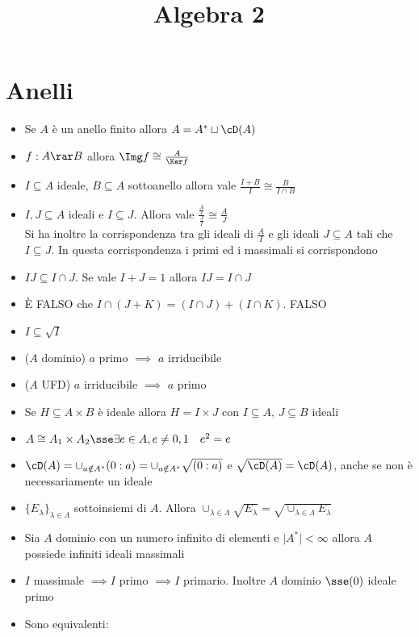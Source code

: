 \documentclass[a4paper,NoNotes,GeneralMath]{stdmdoc}
\begin{document}
	\title{Algebra 2}
	
	\section*{Anelli}
	\begin{itemize}
		\item Se $A$ è un anello finito allora $A = A^* \sqcup \cD(A)$
		\item $f: A \rar B$ allora $\Img f \cong \frac{A}{\Ker f}$
		\item $I \subseteq A$ ideale, $B \subseteq A$ sottoanello allora vale $\frac{I+B}{I} \cong \frac{B}{I\cap B}$
		\item $I, J \subseteq A$ ideali e $I \subseteq J$. Allora vale $\frac{\frac{A}{I}}{\frac{J}{I}} \cong \frac{A}{J}$ \\
			Si ha inoltre la corrispondenza tra gli ideali di $\frac{A}{I}$ e gli ideali $J \subseteq A$ tali che $I \subseteq J$. In questa corrispondenza i primi ed i massimali si corrispondono
		\item $IJ \subseteq I \cap J$. Se vale $I + J = 1$ allora $IJ = I \cap J$
		\item È FALSO che $I \cap (J + K) = (I \cap J) + (I \cap K)$. FALSO
		\item $I \subseteq \sqrt{I}$
		\item ($A$ dominio) $a$ primo $\implies$ $a$ irriducibile
		\item ($A$ UFD) $a$ irriducibile $\implies$ $a$ primo
		\item Se $H \subseteq A \times B$ è ideale allora $H = I \times J$ con $I \subseteq A$, $J \subseteq B$ ideali
		\item $A \cong A_1 \times A_2 \sse \exists e \in A, e \neq 0,1 \quad e^2 = e$
		\item $\cD(A) = \cup_{a \notin A^*} (0 : a) = \cup_{a \notin A^*} \sqrt{(0 : a)}$ e $\sqrt{\cD(A)} = \cD(A)$, anche se non è necessariamente un ideale
		\item $\{ E_\lambda \}_{\lambda \in \Lambda}$ sottoinsiemi di $A$. Allora $\cup_{\lambda \in \Lambda} \sqrt{E_\lambda} = \sqrt{\cup_{\lambda \in \Lambda} E_\lambda}$
		\item Sia $A$ dominio con un numero infinito di elementi e $\mid A^* \mid < \infty$ allora $A$ possiede infiniti ideali massimali
		\item $I$ massimale $\implies I$ primo $\implies I$ primario. Inoltre $A$ dominio $\sse (0)$ ideale primo
		\item Sono equivalenti:
			\begin{itemize}

\end{itemize}
\end{itemize}
\end{document}
